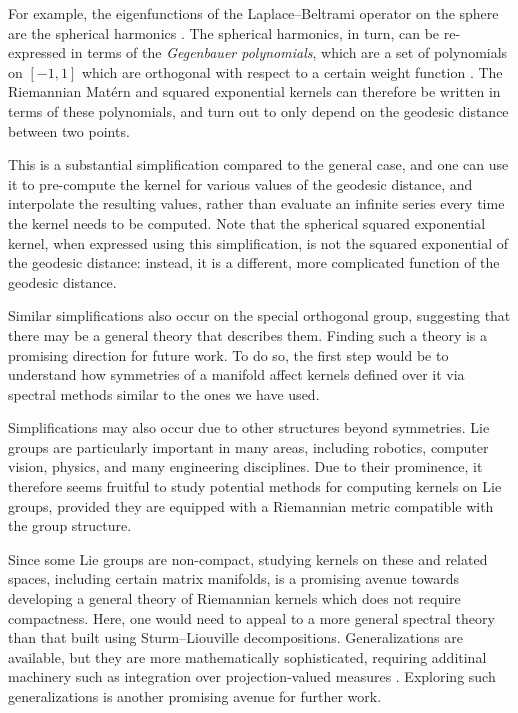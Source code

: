 \documentclass[11pt]{book}
\begin{document}
For example, the eigenfunctions of the Laplace--Beltrami operator on the sphere are the spherical harmonics \cite{chavel84}.
The spherical harmonics, in turn, can be re-expressed in terms of the \emph{Gegenbauer polynomials}, which are a set of polynomials on $[-1,1]$ which are orthogonal with respect to a certain weight function \cite{gradshteyn14}.
The Riemannian Matérn and squared exponential kernels can therefore be written in terms of these polynomials, and turn out to only depend on the geodesic distance between two points.

This is a substantial simplification compared to the general case, and one can use it to pre-compute the kernel for various values of the geodesic distance, and interpolate the resulting values, rather than evaluate an infinite series every time the kernel needs to be computed.
Note that the spherical squared exponential kernel, when expressed using this simplification, is not the squared exponential of the geodesic distance: instead, it is a different, more complicated function of the geodesic distance.

Similar simplifications also occur on the special orthogonal group, suggesting that there may be a general theory that describes them.
Finding such a theory is a promising direction for future work.
To do so, the first step would be to understand how symmetries of a manifold affect kernels defined over it via spectral methods similar to the ones we have used.

Simplifications may also occur due to other structures beyond symmetries.
Lie groups are particularly important in many areas, including robotics, computer vision, physics, and many engineering disciplines.
Due to their prominence, it therefore seems fruitful to study potential methods for computing kernels on Lie groups, provided they are equipped with a Riemannian metric compatible with the group structure.

Since some Lie groups are non-compact, studying kernels on these and related spaces, including certain matrix manifolds, is a promising avenue towards developing a general theory of Riemannian kernels which does not require compactness.
Here, one would need to appeal to a more general spectral theory than that built using Sturm--Liouville decompositions.
Generalizations are available, but they are more mathematically sophisticated, requiring additinal machinery such as integration over projection-valued measures \cite{lang12}.
Exploring such generalizations is another promising avenue for further work.
\end{document}

